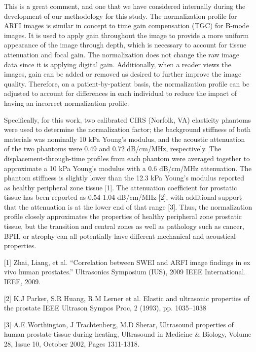 \documentclass[10pt]{article}
\begin{document}
\begin{itemize}
    This is a great comment, and one that we have considered internally during
    the development of our methodology for this study.  The normalization
    profile for ARFI images is similar in concept to time gain compensation
    (TGC) for B-mode images. It is used to apply gain throughout the image to
    provide a more uniform appearance of the image through depth, which is
    necessary to account for tissue attenuation and focal gain. The
    normalization does not change the raw image data since it is applying
    digital gain. Additionally, when a reader views the images, gain can be
    added or removed as desired to further improve the image quality.
    Therefore, on a patient-by-patient basis, the normalization profile can be
    adjusted to account for differences in each individual to reduce the impact
    of having an incorrect normalization profile.

    Specifically, for this work, two calibrated CIRS (Norfolk, VA) elasticity
    phantoms were used to determine the normalization factor; the background
    stiffness of both materials was nominally 10 kPa Young's modulus, and the
    acoustic attenuation of the two phantoms were 0.49 and 0.72 dB/cm/MHz,
    respectively. The displacement-through-time profiles from each phantom were
    averaged together to approximate a 10 kPa Young's modulus with a 0.6
    dB/cm/MHz attenuation. The phantom stiffness is slightly lower than the
    12.3 kPa Young's modulus reported as healthy peripheral zone tissue [1].
    The attenuation coefficient for prostatic tissue has been reported as
    0.54-1.04 dB/cm/MHz [2], with additional support that the attenuation is at
    the lower end of that range [3]. Thus, the normalization profile closely
    approximates the properties of healthy peripheral zone prostatic tissue,
    but the transition and central zones as well as pathology such as cancer,
    BPH, or atrophy can all potentially have different mechanical and
    acoustical properties.

    [1] Zhai, Liang, et al. ``Correlation between SWEI and ARFI image findings
    in ex vivo human prostates.'' Ultrasonics Symposium (IUS), 2009 IEEE
    International. IEEE, 2009.

    [2] K.J Parker, S.R Huang, R.M Lerner et al. Elastic and ultrasonic
    properties of the prostate IEEE Ultrason Sympos Proc, 2 (1993), pp.
    1035–1038

    [3] A.E Worthington, J Trachtenberg, M.D Sherar, Ultrasound properties of
    human prostate tissue during heating, Ultrasound in Medicine \& Biology,
    Volume 28, Issue 10, October 2002, Pages 1311-1318.


\end{itemize}
\end{document}

